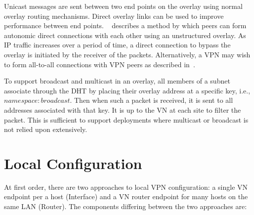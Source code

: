 Unicast messages are sent between two end points on the overlay using normal
overlay routing mechanisms.  Direct overlay links can be used to improve
performance between end points.  ~\cite{ipop} describes a method by which peers
can form autonomic direct connections with each other using an unstructured
overlay.  As IP traffic increases over a period of time, a direct connection to
bypass the overlay is initiated by the receiver of the packets.  Alternatively,
a VPN may wish to form all-to-all connections with VPN peers as described
in~\cite{cops08}.

To support broadcast and multicast in an overlay, all members of a subnet
associate through the DHT by placing their overlay address at a specific key,
i.e., $namespace:broadcast$.  Then when such a packet is received, it is sent
to all addresses associated with that key.  It is up to the VN at each site to
filter the packet.  This is sufficient to support deployments where multicast
or broadcast is not relied upon extensively.  

\section{Local Configuration} At first order, there are two approaches to local
VPN configuration: a single VN endpoint per a host (Interface) and a VN router
endpoint for many hosts on the same LAN (Router).  The components differing
between the two approaches are:

